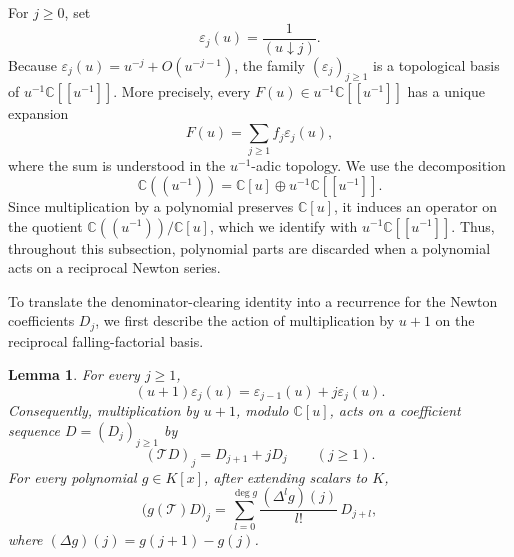 \documentclass[11pt]{amsart}
\numberwithin{equation}{section}
\newtheorem{lemma}[theorem]{Lemma}
\theoremstyle{definition}
\theoremstyle{remark}
\newcommand{\C}{\mathbb C}
\newcommand{\fall}[2]{(#1\mathbin{\downarrow}#2)}
\begin{document}
For \(j\geq0\), set
\[
 \varepsilon_j(u)=\frac{1}{\fall{u}{j}}.
\]
Because
\(\varepsilon_j(u)=u^{-j}+O(u^{-j-1})\), the family
\((\varepsilon_j)_{j\geq1}\) is a topological basis of
\(u^{-1}\C[[u^{-1}]]\).  More precisely, every
\(F(u)\in u^{-1}\C[[u^{-1}]]\) has a unique expansion
\[
 F(u)=\sum_{j\geq1}f_j\varepsilon_j(u),
\]
where the sum is understood in the \(u^{-1}\)-adic topology.  We use
the decomposition
\[
 \C((u^{-1}))=\C[u]\oplus u^{-1}\C[[u^{-1}]].
\]
Since multiplication by a polynomial preserves \(\C[u]\), it induces
an operator on the quotient
\(\C((u^{-1}))/\C[u]\), which we identify with
\(u^{-1}\C[[u^{-1}]]\).  Thus, throughout this subsection, polynomial
parts are discarded when a polynomial acts on a reciprocal Newton
series.

To translate the denominator-clearing identity into a recurrence for
the Newton coefficients \(D_j\), we first describe the action of
multiplication by \(u+1\) on the reciprocal falling-factorial basis.

\begin{lemma}
\label{lem:T-operator}
For every \(j\geq1\),
\begin{equation}
 (u+1)\varepsilon_j(u)
 =\varepsilon_{j-1}(u)+j\varepsilon_j(u).
 \label{eq:epsilon-shift}
\end{equation}
Consequently, multiplication by \(u+1\), modulo \(\C[u]\), acts on a
coefficient sequence \(D=(D_j)_{j\geq1}\) by
\begin{equation}
 (\mathcal TD)_j=D_{j+1}+jD_j
 \qquad(j\geq1).
 \label{eq:T-operator}
\end{equation}
For every polynomial \(g\in K[x]\), after extending scalars to \(K\),
\begin{equation}
 \bigl(g(\mathcal T)D\bigr)_j
 =\sum_{l=0}^{\deg g}
   \frac{(\Delta^lg)(j)}{l!}\,D_{j+l},
 \label{eq:T-closed-form}
\end{equation}
where \((\Delta g)(j)=g(j+1)-g(j)\).
\end{lemma}
\end{document}
